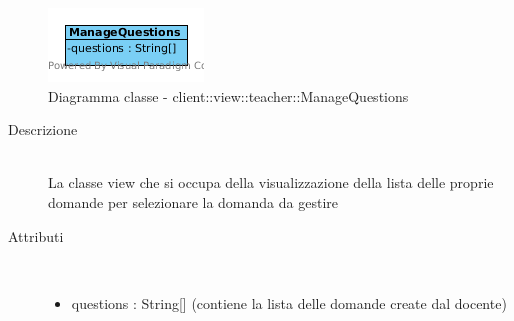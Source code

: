 \vspace{0.5cm}
\hypertarget{client::view::teacher::ManageQuestions}{}
\begin{center}
			\begin{figure}[H]
				\centering \includegraphics[scale=4, max width=\textwidth, max height=\myheight]{../img/diagrammiClassi/client/view/teacher/ManageQuestions.png}
				\caption{Diagramma classe - client::view::teacher::ManageQuestions}
			\end{figure}
		\end{center}\begin{description}
\item[Descrizione] \hfill \\
 La classe view che si occupa della visualizzazione della lista delle proprie domande per selezionare la domanda da gestire
\item[Attributi] \hfill \\
 \vspace{-7mm}
\begin{itemize}
\item questions : String[] (contiene la lista  delle domande create dal docente)
\end{itemize}

\end{description}

